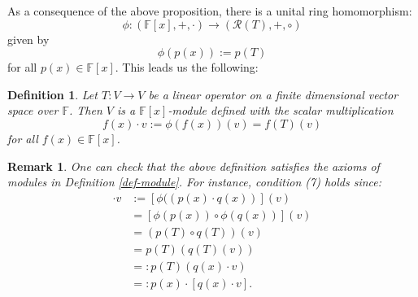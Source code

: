 \documentclass[12pt]{amsbook}
\newtheorem{definition}[theorem]{Definition}
\newtheorem{remark}[theorem]{Remark}
\begin{document}
As a consequence of the above proposition, there is a unital ring homomorphism:
$$\phi: (\mathbb{F}[x], +, \cdot) \longrightarrow (\mathcal{R}(T), +, \circ)$$
given by $$\phi(p(x)) := p(T)$$ for all $p(x) \in \mathbb{F}[x]$. This leads us the following:

\begin{definition} \label{def-fx}
    Let $T:V\to V$ be a linear operator on a finite dimensional vector space over $\mathbb{F}$. Then $V$ is a $\mathbb{F}[x]$-module defined with the scalar multiplication 
    $$f(x)\cdot v:= \phi(f(x))(v) = f(T)(v)$$
    for all $f(x) \in \mathbb{F}[x]$.
\end{definition}
\begin{remark}
    One can check that the above definition satisfies the axioms of modules in Definition \ref{def-module}. For instance, condition (7) holds since:
    \begin{align*}
    [p(x) \cdot q(x)]\cdot v &:= [\phi((p(x)\cdot q(x))](v) \\
    &= [\phi(p(x)) \circ \phi(q(x))](v) \\
    &= (p(T) \circ q(T))(v) \\
    &= p(T)(q(T)(v)) \\
    &=: p(T)\left(q(x)\cdot v\right) \\
    &=: p(x) \cdot [q(x) \cdot v].    
    \end{align*}  
\end{remark}
\end{document}
